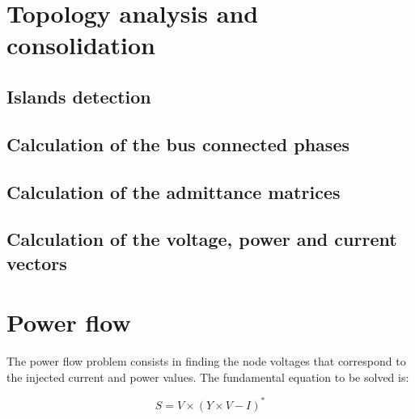 \documentclass[a4paper,twoside,fleqn]{tufte-book}
\begin{document}
\chapter{Topology analysis and consolidation}


\section{Islands detection}


\section{Calculation of the bus connected phases}


\section{Calculation of the admittance matrices}  \label{Y_calculation}


\section{Calculation of the voltage, power and current vectors}


\chapter{Power flow}

The power flow problem consists in finding the node voltages that correspond to the injected current and power values. The fundamental equation to be solved is:

\begin{equation}
S = V \times (Y \times V - I)^*
\label{eq:power_flow}
\end{equation}

\end{document}
